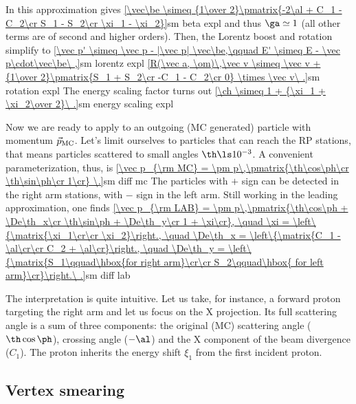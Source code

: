 In this approximation  gives
\eqref{\vec\be \simeq {1\over 2}\pmatrix{-2\al + C_1 - C_2\cr S_1 - S_2\cr \xi_1 - \xi_2}}{sm beta expl}
and thus $\ga\simeq 1$ (all other terms are of second and higher orders). Then, the Lorentz boost  and rotation  simplify to
\eqref{\vec p' \simeq \vec p - |\vec p| \vec\be,\qquad E' \simeq E - \vec p\cdot\vec\be\ ,}{sm lorentz expl}
\eqref{R(\vec a, \om)\,\vec v \simeq \vec v + {1\over 2}\pmatrix{S_1 + S_2\cr -C_1 - C_2\cr 0} \times \vec v\ .}{sm rotation expl}
The energy scaling factor turns out
\eqref{\ch \simeq 1 + {\xi_1 + \xi_2\over 2}\ .}{sm energy scaling expl}

Now we are ready to apply  to an outgoing (MC generated) particle with momentum $\vec p_{\rm MC}$. Let's limit ourselves to particles that can reach the RP stations, that means particles scattered to small angles $\th \ls 10^{-3}$. A convenient parameterization, thus, is
\eqref{\vec p_{\rm MC} = \pm p\,\pmatrix{\th\cos\ph\cr \th\sin\ph\cr 1\cr} \.}{sm diff mc}
The particles with $+$ sign can be detected in the right arm stations, with $-$ sign in the left arm. Still working in the leading approximation, one finds
\eqref{\vec p_{\rm LAB} = \pm p\,\pmatrix{\th\cos\ph + \De\th_x\cr \th\sin\ph + \De\th_y\cr 1 + \xi\cr},
\quad \xi = \left\{\matrix{\xi_1\cr\cr \xi_2}\right.,
\quad \De\th_x = \left\{\matrix{C_1 - \al\cr\cr C_2 + \al\cr}\right.,
\quad \De\th_y = \left\{\matrix{S_1\qquad\hbox{for right arm}\cr\cr S_2\qquad\hbox{ for left arm}\cr}\right.\ .}{sm diff lab} %

The interpretation is quite intuitive. Let us take, for instance, a forward proton targeting the right arm and let us focus on the X projection. Its full scattering angle is a sum of three components: the original (MC) scattering angle ($\th\cos\ph$), crossing angle ($-\al$) and the X component of the beam divergence ($C_1$). The proton inherits the energy shift $\xi_1$ from the first incident proton.

\iffalse
Using the statistical properties suggested in the previous section yields the following relation between variances (recalling $\si_\th$ refers to the beam divergence)
\eqref{\si_{\De\th_x} = \si_{\De\th_y} = \si_{C_1} = \si_{C_2} = \si_{S_1} = \si_{S_2} = \cases{
{\si_\th\over\sqrt2}\qquad\hbox{for parameterization \Eq{mom par 1}}\cr
\si_\th\qquad\hbox{for parameterization \Eq{mom par 2}}\cr
}\ .}{delta th sigma}
\fi


\subsection{Vertex smearing}

